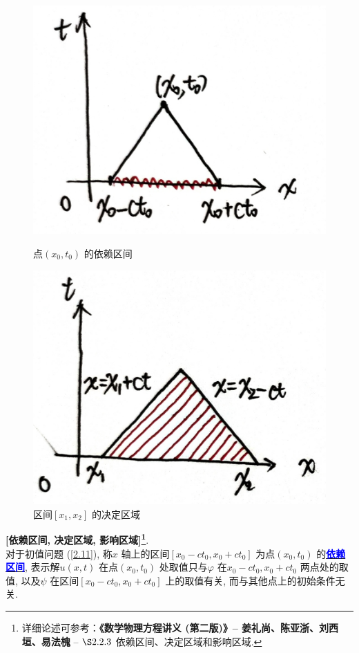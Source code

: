 \begin{thm}
\begin{rmk}
			\begin{figure}[thbp!]
				\centering
				\begin{minipage}[t]{0.49\linewidth}
					\centering
					\includegraphics[width=0.5\linewidth]{figure/2.3-1}
					\caption{点$(x_0 , t_0)$ 的依赖区间}
					\label{fig : 2.3-1}
				\end{minipage}
				\begin{minipage}[t]{0.49\linewidth}
					\centering
					\includegraphics[width=0.5\linewidth]{figure/2.3-2}
					\caption{区间$[x_1 , x_2]$ 的决定区域}
					\label{fig : 2.3-2}
				\end{minipage}
			\end{figure}
		
			\vspace*{2em}
			
			\begin{defn}\label{def 2.3.1}
				\textbf{[依赖区间, 决定区域, 影响区域]\footnote{详细论述可参考：\textbf{《数学物理方程讲义 (第二版)》--  姜礼尚、陈亚浙、刘西垣、易法槐} -- $\S 2.2.3$ 依赖区间、决定区域和影响区域. }}. \\
				对于初值问题 (\ref{2.11}), 称$x$ 轴上的区间$[x_0 - ct_0 , x_0 + ct_0]$ 为点$(x_0 , t_0)$ 的\underline{\textcolor{blue}{\textbf{依赖区间}}}, 表示解$u(x , t)$ 在点$(x_0 , t_0)$ 处取值只与$\varphi$ 在$x_0 - ct_0 , x_0 + ct_0$ 两点处的取值, 以及$\psi$ 在区间$[x_0 - ct_0 , x_0 + ct_0]$ 上的取值有关, 而与其他点上的初始条件无关. 
				
				\newpage
				

\end{defn}
\end{rmk}
\end{thm}
